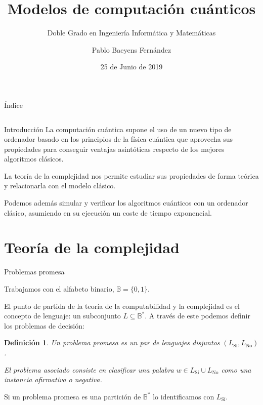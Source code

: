 \documentclass[ignorenonframetext,aspectratio=43,]{beamer}
\title{Modelos de computación cuánticos}
\subtitle{Doble Grado en Ingeniería Informática y Matemáticas}
\author{Pablo Baeyens Fernández}
\institute{Trabajo Fin de Grado \\\\\\ \emph{E.T.S. de Ingenierías Informática y de Telecomunicación} \\ \emph{Facultad de Ciencias}}
\date{25 de Junio de 2019}
\newtheorem{definicion}{Definición}
\newcommand{\BB}{\mathbb{B}}
\begin{document}
\frame{\titlepage}

\begin{frame}{Índice}
  \begin{columns}[t]
    \begin{column}{.5\textwidth}
      \tableofcontents[sections={1}]
    \end{column}
    \begin{column}{.5\textwidth}
      \tableofcontents[sections={2}]
    \end{column}
  \end{columns}
\end{frame}

\begin{frame}{Introducción}
  La computación cuántica supone el uso de un nuevo tipo de ordenador basado en los principios de la física cuántica que aprovecha sus propiedades para conseguir ventajas asintóticas respecto de los mejores algoritmos clásicos.

  La teoría de la complejidad nos permite estudiar sus propiedades de forma teórica y relacionarla con el modelo
  clásico.

  Podemos además simular y verificar los algoritmos cuánticos con un ordenador clásico, asumiendo en su ejecución
  un coste de tiempo exponencial.

\end{frame}

\section{Teoría de la complejidad}

\begin{frame}{Problemas promesa}

  Trabajamos con el alfabeto binario, $\BB = \{0,1\}$.

  El punto de partida de la teoría de la computabilidad y la complejidad es el concepto de lenguaje:
  un subconjunto $L \subseteq \BB^\ast$. A través de este podemos definir los problemas de decisión:


  \begin{definicion}
    Un \emph{problema promesa} es un par de lenguajes disjuntos $(L_{\operatorname{Sí}}, L_{\operatorname{No}})$.

    El problema asociado consiste en clasificar una palabra $w \in L_{\operatorname{Sí}} \cup L_{\operatorname{No}}$ como una instancia afirmativa o negativa.
  \end{definicion}

  Si un problema promesa es una partición de $\BB^\ast$ lo identificamos con $L_{\operatorname{Sí}}$.
\end{frame}
\end{document}

